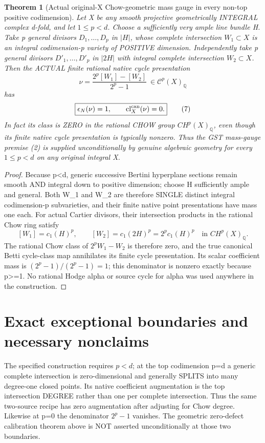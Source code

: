\documentclass[11pt]{article}
\newtheorem{theorem}{Theorem}
\newcommand{\Q}{\mathbb Q}
\newcommand{\cl}{\mathrm{cl}}
\begin{document}
\begin{theorem}[Actual original-X Chow-geometric mass gauge in every non-top positive codimension]
Let X be any smooth projective geometrically
INTEGRAL complex d-fold, and let
\(1\le p<d\). Choose a sufficiently very ample
line bundle H. Take p general divisors
\(D_1,\ldots,D_p\) in \(|H|\), whose complete
intersection \(W_1\subset X\) is an integral
codimension-p variety of POSITIVE dimension.
Independently take p general divisors
\(D'_1,\ldots,D'_p\) in \(|2H|\) with integral
complete intersection \(W_2\subset X\).
Then the ACTUAL finite rational native cycle
presentation
\[
 \boxed{
 \nu=\frac{2^p[W_1]-[W_2]}{2^p-1}
       \ \in\mathcal C^p(X)_\Q
 }                                                        \tag{6}
\]
has
\[
 \boxed{\epsilon_N(\nu)=1,\qquad
          \cl_X^{\rm can}(\nu)=0.}                \tag{7}
\]
In fact its class is ZERO in the rational CHOW
group \(CH^p(X)_\Q\), even though its finite
native cycle presentation is typically nonzero.
Thus the GST mass-gauge premise (2) is supplied
unconditionally by genuine algebraic geometry
for every \(1\le p<d\) on any original integral X.
\end{theorem}
\begin{proof}
Because p<d, generic successive Bertini hyperplane
sections remain smooth AND integral down to positive
dimension; choose H sufficiently ample and general.
Both W_1 and W_2 are therefore SINGLE distinct
integral codimension-p subvarieties, and their
finite native point presentations have mass one each.
For actual Cartier divisors, their intersection
products in the rational Chow ring satisfy
\[
 [W_1]=c_1(H)^p,\qquad
 [W_2]=c_1(2H)^p=2^p c_1(H)^p
                       \quad\text{in }CH^p(X)_\Q .
\]
The rational Chow class of \(2^p W_1-W_2\) is
therefore zero, and the true canonical Betti
cycle-class map annihilates its finite cycle
presentation. Its scalar coefficient mass is
\((2^p-1)/(2^p-1)=1\); this denominator is
nonzero exactly because p>=1.
No rational Hodge alpha or source cycle for
alpha was used anywhere in the construction.
\end{proof}

\section{Exact exceptional boundaries and necessary nonclaims}
The specified construction requires \(p<d\);
at the top codimension p=d a generic complete
intersection is zero-dimensional and generally
SPLITS into many degree-one closed points.
Its native coefficient augmentation is the
top intersection DEGREE rather than one per
complete intersection. Thus the same two-source
recipe has zero augmentation after adjusting
for Chow degree. Likewise at p=0 the denominator
\(2^p-1\) vanishes. The geometric zero-defect
calibration theorem above is NOT asserted
unconditionally at those two boundaries.
\end{document}
